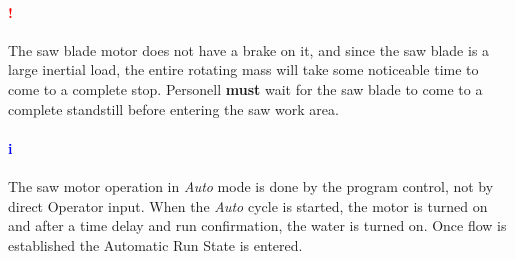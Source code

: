 \paragraph{\textbf{{\LARGE \textcolor{red}{!}}}}The saw blade motor does not have a brake on it, and since the saw blade is a large inertial load, the entire rotating mass will take some noticeable time to come to a complete stop. Personell \textbf{must} wait for the saw blade to come to a complete standstill before entering the saw work area.
\paragraph{\textbf{\LARGE \textcolor{blue}{i}}}The saw motor operation in \textit{Auto} mode is done by the program control, not by direct Operator input. When the \textit{Auto} cycle is started, the motor is turned on and after a time delay and run confirmation, the water is turned on. Once flow is established the Automatic Run State is entered.